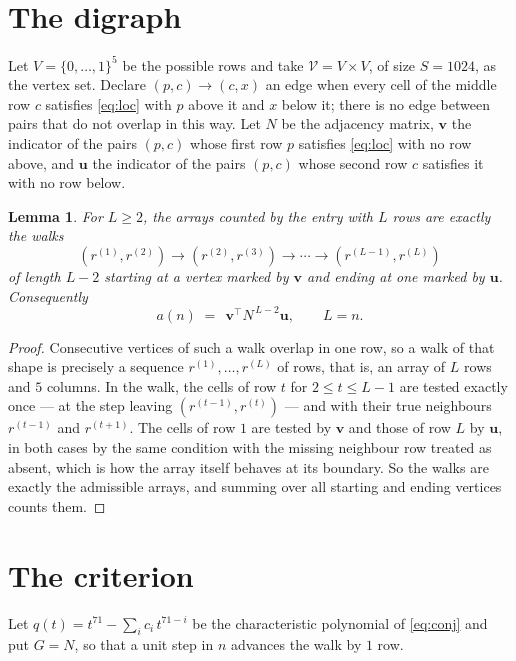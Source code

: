 \documentclass[11pt,a4paper]{article}
\theoremstyle{plain}
\newtheorem{lemma}[theorem]{Lemma}
\theoremstyle{definition}
\begin{document}
\section{The digraph}

Let $V=\{0,\dots,1\}^{5}$ be the possible rows and take
$\mathcal V=V\times V$, of size $S=1024$, as the vertex set. Declare $(p,c)\to(c,x)$ an edge
when every cell of the middle row $c$ satisfies \eqref{eq:loc} with $p$ above it and $x$
below it; there is no edge between pairs that do not overlap in this way. Let $N$ be the
adjacency matrix, $\mathbf{v}$ the indicator of the pairs $(p,c)$ whose first row $p$
satisfies \eqref{eq:loc} with no row above, and $\mathbf{u}$ the indicator of
the pairs $(p,c)$ whose second row $c$ satisfies it with no row below.

\begin{lemma}\label{lem:walk}
For $L\ge2$, the arrays counted by the entry with $L$ rows are exactly the walks
\[
(r^{(1)},r^{(2)})\to(r^{(2)},r^{(3)})\to\cdots\to(r^{(L-1)},r^{(L)})
\]
of length $L-2$ starting at a vertex marked by $\mathbf{v}$ and ending at one marked by
$\mathbf{u}$. Consequently
\[
a(n)\;=\;\,\mathbf{v}^{\!\top}N^{\,L-2}\mathbf{u},\qquad L=n .
\]
\end{lemma}

\begin{proof}
Consecutive vertices of such a walk overlap in one row, so a walk of that shape is
precisely a sequence $r^{(1)},\dots,r^{(L)}$ of rows, that is, an array of $L$ rows
and $5$ columns. In the walk, the cells of row $t$ for $2\le t\le L-1$ are tested
exactly once --- at the step leaving $(r^{(t-1)},r^{(t)})$ --- and with their true
neighbours $r^{(t-1)}$ and $r^{(t+1)}$. The cells of row $1$ are tested by
$\mathbf{v}$ and those of row $L$ by $\mathbf{u}$, in both cases by the same condition
with the missing neighbour row treated as absent, which is how the array itself behaves at
its boundary. So the walks are exactly the admissible arrays, and summing over all starting
and ending vertices counts them.
\end{proof}

\section{The criterion}

Let $q(t)=t^{71}-\sum_i c_i\,t^{71-i}$ be the characteristic polynomial of
\eqref{eq:conj} and put $G=N$, so that a unit step in $n$ advances the walk by
$1$ row.
\end{document}
